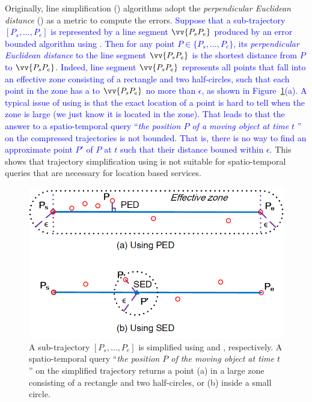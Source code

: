 Originally, line simplification (\lsa) algorithms adopt the \emph{perpendicular Euclidean distance} (\ped) as a metric to compute the errors.
\textcolor{blue}{Suppose that a sub-trajectory $[P_s, ..., P_e]$ is represented by a line segment $\vv{P_sP_e}$  produced by an error bounded \lsa algorithm using \ped. Then for any point $P \in \{P_s, ..., P_e\}$, its \emph{perpendicular Euclidean distance} to the line segment $\vv{P_sP_e}$  is the shortest distance from $P$ to $\vv{P_sP_e}$.}
\textcolor{blue}{Indeed, line segment $\vv{P_sP_e}$ represents all points that fall into an effective zone consisting of a rectangle and two half-circles, such that each point in the zone has a \ped to $\vv{P_sP_e}$ no more than $\epsilon$,  as shown in Figure~\ref{fig:distances}(a).}
\textcolor{blue}{A typical issue of using \ped is that the exact location of a point is hard to tell when the zone is large (we just know it is located in the zone).}
%
\textcolor{blue}{That leads to that the answer to a spatio-temporal query ``\emph{the position $P$ of a moving object at time $t$} \cite{Cao:Spatio}'' on the compressed trajectories is not bounded. That is, there is no way to find an approximate point $P'$ of $P$ at $t$ such that their distance bouned within $\epsilon$}.
This shows that trajectory simplification using \ped is not suitable for spatio-temporal queries that are necessary for location based services.
%



\begin{figure}[tb!]
\centering
\includegraphics[scale=1.2]{figures/Fig-Distances.png}
\caption{\small A sub-trajectory $[P_s, \ldots, P_e]$ is simplified using \ped and \sed, respectively. A spatio-temporal query ``\emph{the position $P$ of the moving object at time $t$}'' on the simplified trajectory returns a point (a) in a large zone consisting of a rectangle and two half-circles, or (b) inside a small circle.}
\vspace{-3ex}
\label{fig:distances}
\end{figure}

